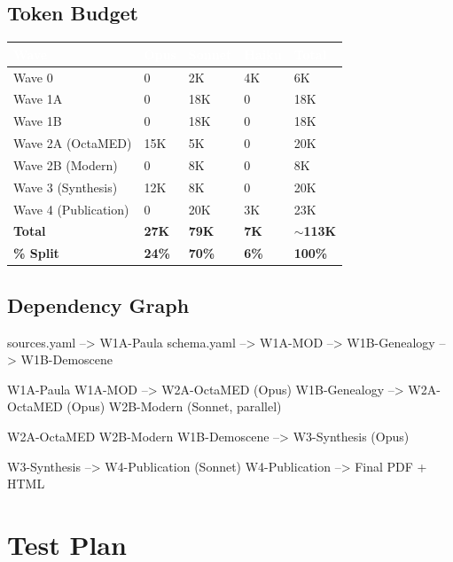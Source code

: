 \documentclass[11pt,letterpaper]{article}
\newcommand{\tableheader}[1]{\textbf{\sffamily\textcolor{white}{#1}}}
\begin{document}
\subsection{Token Budget}

\begin{center}
\begin{tabularx}{\textwidth}{L{3.5cm}C{2cm}C{2cm}C{2cm}C{2cm}}
\toprule
{}
\tableheader{Wave} & \tableheader{Opus} & \tableheader{Sonnet} & \tableheader{Haiku} & \tableheader{Total} \\
\midrule
Wave 0 & 0 & 2K & 4K & 6K \\
Wave 1A & 0 & 18K & 0 & 18K \\
Wave 1B & 0 & 18K & 0 & 18K \\
Wave 2A (OctaMED) & 15K & 5K & 0 & 20K \\
Wave 2B (Modern) & 0 & 8K & 0 & 8K \\
Wave 3 (Synthesis) & 12K & 8K & 0 & 20K \\
Wave 4 (Publication) & 0 & 20K & 3K & 23K \\
\midrule
\textbf{Total} & \textbf{27K} & \textbf{79K} & \textbf{7K} & \textbf{$\sim$113K} \\
\midrule
\textbf{\% Split} & \textbf{24\%} & \textbf{70\%} & \textbf{6\%} & \textbf{100\%} \\
\bottomrule
\end{tabularx}
\end{center}

\subsection{Dependency Graph}

\begin{asciibox}
sources.yaml --> W1A-Paula
schema.yaml  --> W1A-MOD
             --> W1B-Genealogy
             --> W1B-Demoscene

W1A-Paula
W1A-MOD       --> W2A-OctaMED (Opus)
W1B-Genealogy --> W2A-OctaMED (Opus)
                  W2B-Modern  (Sonnet, parallel)

W2A-OctaMED
W2B-Modern
W1B-Demoscene --> W3-Synthesis (Opus)

W3-Synthesis  --> W4-Publication (Sonnet)
W4-Publication --> Final PDF + HTML
\end{asciibox}

\section{Test Plan}
\end{document}
